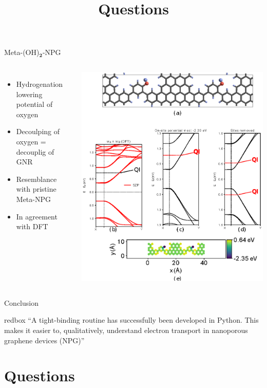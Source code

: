 \documentclass[hyperref={colorlinks=true,urlcolor=blue,linkcolor=.},aspectratio=1610,mathserif]{beamer}
\newcommand*\mathinhead[2]{\texorpdfstring{$\boldsymbol{#1}$}{#2}}
\begin{document}
\begin{frame}{Meta-(OH)\mathinhead{_2}{_2}-NPG}
	\centering
	\begin{columns}[c]
		\begin{itemize}
			\item Hydrogenation lowering potential of oxygen
			\item Decoulping of oxygen = decouplig of GNR
			\item Resemblance with pristine Meta-NPG
			\item In agreement with DFT
		\end{itemize}
		\includegraphics[height=.8\textwidth]{Figures/fig22.eps}
	\end{columns}
\end{frame}

\begin{frame}{Conclusion}
	\centering
	\begin{beamercolorbox}[sep=1em,wd=15cm]{redbox}
		``A tight-binding routine has successfully been developed in Python. This makes it easier to, qualitatively, understand electron transport in nanoporous graphene devices (NPG)''\huge\checkmark
	\end{beamercolorbox}
\end{frame}

\section*{Questions}
\title{Questions}
\subtitle{}
\begin{frame}
	\titlepage
\end{frame}
%
\end{document}
